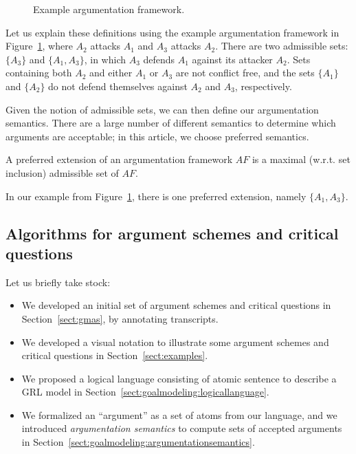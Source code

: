 \begin{figure}[ht!]
\centering
{}
\caption{Example argumentation framework.}
\label{fig:goalmodeling:arg2}
\end{figure}

Let us explain these definitions using the example argumentation framework in Figure~\ref{fig:goalmodeling:arg2}, where $A_2$ attacks $A_1$ and $A_3$ attacks $A_2$. There are two admissible sets: $\{A_3\}$ and $\{A_1, A_3\}$, in which $A_3$ defends $A_1$ against its attacker $A_2$. Sets containing both $A_2$ and either $A_1$ or $A_3$ are not conflict free, and the sets $\{A_1\}$ and $\{A_2\}$ do not defend themselves against $A_2$ and $A_3$, respectively. 

Given the notion of admissible sets, we can then define our argumentation semantics. There are a large number of different semantics to determine which arguments are acceptable; in this article, we choose preferred semantics.

\begin{definition} \label{def:semantics}
A preferred extension of an argumentation framework $AF$ is a maximal (w.r.t. set inclusion) admissible set of $AF$.
\end{definition}

In our example from Figure~\ref{fig:goalmodeling:arg2}, there is one preferred extension, namely $\{A_1,A_3\}$.

\subsection{Algorithms for argument schemes and critical questions}
\label{sect:algorithms}

Let us briefly take stock:
\begin{itemize}
\item We developed an initial set of argument schemes and critical questions in Section~\ref{sect:gmas}, by annotating transcripts.
\item We developed a visual notation to illustrate some argument schemes and critical questions in Section~\ref{sect:examples}.
\item We proposed a logical language consisting of atomic sentence to describe a GRL model in Section~\ref{sect:goalmodeling:logicallanguage}.
\item We formalized an ``argument'' as a set of atoms from our language, and we introduced \emph{argumentation semantics} to compute sets of accepted arguments in Section~\ref{sect:goalmodeling:argumentationsemantics}.
\end{itemize}

